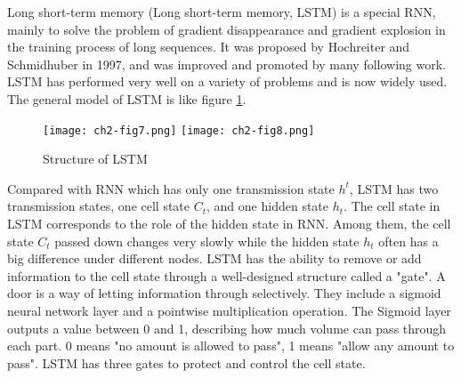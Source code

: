 Long short-term memory (Long short-term memory, LSTM) is a special RNN, mainly to solve the problem of gradient disappearance and gradient explosion in the training process of long sequences. It was proposed by Hochreiter and Schmidhuber in 1997\cite{lstm1997}, and was improved and promoted by many following work. LSTM has performed very well on a variety of problems and is now widely used. The general model of LSTM is like figure \ref{ch2-fig7}.

\begin{figure}[h]
	\centering
	\texttt{[image: ch2-fig7.png]}
	\texttt{[image: ch2-fig8.png]}
	\caption{Structure of LSTM}
	\label{ch2-fig7}
\end{figure}


Compared with RNN which has only one transmission state $h^t$, LSTM has two transmission states, one cell state $C_t$, and one hidden state $h_t$. The cell state in LSTM corresponds to the role of the hidden state in RNN. Among them, the cell state $C_t$ passed down changes very slowly while the hidden state $h_t$ often has a big difference under different nodes. LSTM has the ability to remove or add information to the cell state through a well-designed structure called a "gate". A door is a way of letting information through selectively. They include a sigmoid neural network layer and a pointwise multiplication operation. The Sigmoid layer outputs a value between 0 and 1, describing how much volume can pass through each part. 0 means "no amount is allowed to pass", 1 means "allow any amount to pass". LSTM has three gates to protect and control the cell state. 

